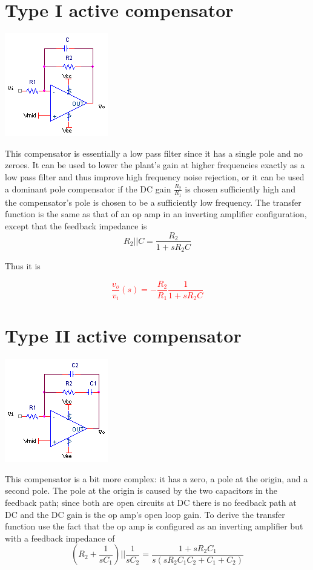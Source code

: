 \section{Type I active compensator}
\begin{center}
	\includegraphics{schematics/type1compensator.PNG}
\end{center}
This compensator is essentially a low pass filter since it has a single pole and no zeroes. It can be used to lower the plant's gain at higher frequencies exactly as a low pass filter and thus improve high frequency noise rejection, or it can be used a dominant pole compensator if the DC gain $\frac{R_{2}}{R_{1}}$ is chosen sufficiently high and the compensator's pole is chosen to be a sufficiently low frequency. The transfer function is the same as that of an op amp in an inverting amplifier configuration, except that the feedback impedance is
\begin{equation}
R_{2}||C = \frac{R_{2}}{1+sR_{2}C}
\end{equation}

Thus it is

\textcolor{red}{
\begin{equation}
\frac{v_{o}}{v_{i}}(s) = -\frac{R_{2}}{R_{1}}\frac{1}{1+sR_{2}C}
\label{eq:type1compensator}
\end{equation}
}

\section{Type II active compensator}
\begin{center}
	\includegraphics{schematics/type2compensator.PNG}
\end{center}
This compensator is a bit more complex: it has a zero, a pole at the origin, and a second pole. The pole at the origin is caused by the two capacitors in the feedback path; since both are open circuits at DC there is no feedback path at DC and the DC gain is the op amp's open loop gain. To derive the transfer function use the fact that the op amp is configured as an inverting amplifier but with a feedback impedance of
\begin{equation}
\left(R_{2}+\frac{1}{sC_{1}}\right)||\frac{1}{sC_{2}} = \frac{1+sR_{2}C_{1}}{s(sR_{2}C_{1}C_{2}+C_{1}+C_{2})}
\end{equation}

